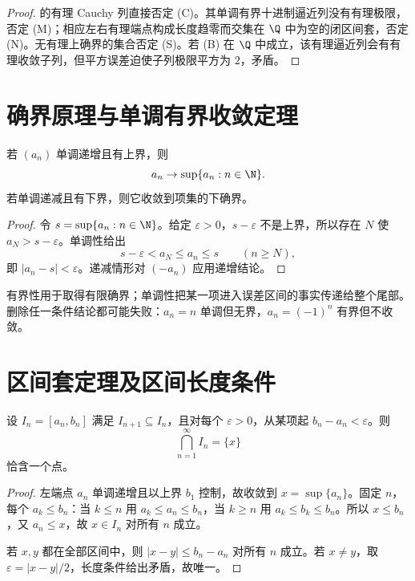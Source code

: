\begin{proof}
的有理 Cauchy 列直接否定 (C)。其单调有界十进制逼近列没有有理极限，否定 (M)；相应左右有理端点构成长度趋零而交集在 \(\Q\) 中为空的闭区间套，否定 (N)。无有理上确界的集合否定 (S)。若 (B) 在 \(\Q\) 中成立，该有理逼近列会有有理收敛子列，但平方误差迫使子列极限平方为 \(2\)，矛盾。
\end{proof}

\section{确界原理与单调有界收敛定理}

\begin{theorem}[单调有界收敛]
若 \((a_n)\) 单调递增且有上界，则
\[
 a_n\to\sup\{a_n:n\in\N\}.
\]
若单调递减且有下界，则它收敛到项集的下确界。
\end{theorem}

\begin{proof}
令 \(s=\sup\{a_n:n\in\N\}\)。给定 \(\varepsilon>0\)，\(s-\varepsilon\) 不是上界，所以存在 \(N\) 使 \(a_N>s-\varepsilon\)。单调性给出
\[
 s-\varepsilon<a_N\le a_n\le s\qquad(n\ge N),
\]
即 \(|a_n-s|<\varepsilon\)。递减情形对 \((-a_n)\) 应用递增结论。
\end{proof}

有界性用于取得有限确界；单调性把某一项进入误差区间的事实传递给整个尾部。删除任一条件结论都可能失败：\(a_n=n\) 单调但无界，\(a_n=(-1)^n\) 有界但不收敛。

\section{区间套定理及区间长度条件}

\begin{theorem}[区间套定理]
设 \(I_n=[a_n,b_n]\) 满足 \(I_{n+1}\subseteq I_n\)，且对每个 \(\varepsilon>0\)，从某项起 \(b_n-a_n<\varepsilon\)。则
\[
 \bigcap_{n=1}^{\infty}I_n=\{x\}
\]
恰含一个点。
\end{theorem}

\begin{proof}
左端点 \(a_n\) 单调递增且以上界 \(b_1\) 控制，故收敛到 \(x=\sup\{a_n\}\)。固定 \(n\)，每个 \(a_k\le b_n\)：当 \(k\le n\) 用 \(a_k\le a_n\le b_n\)，当 \(k\ge n\) 用 \(a_k\le b_k\le b_n\)。所以 \(x\le b_n\)，又 \(a_n\le x\)，故 \(x\in I_n\) 对所有 \(n\) 成立。

若 \(x,y\) 都在全部区间中，则 \(|x-y|\le b_n-a_n\) 对所有 \(n\) 成立。若 \(x\ne y\)，取 \(\varepsilon=|x-y|/2\)，长度条件给出矛盾，故唯一。
\end{proof}

